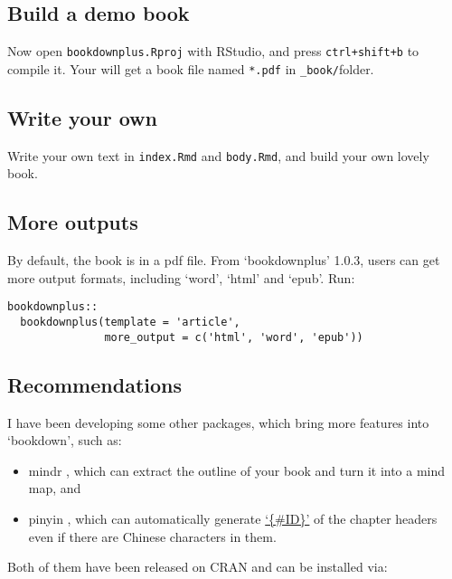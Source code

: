 \documentclass[hess, online, hvmath]{style/copernicus}
\begin{document}
\subsection{Build a demo book}\label{build-a-demo-book}

Now open \texttt{bookdownplus.Rproj} with RStudio, and press
\texttt{ctrl+shift+b} to compile it. Your will get a book file named
\texttt{*.pdf} in \texttt{\_book/}folder.

\subsection{Write your own}\label{write-your-own}

Write your own text in \texttt{index.Rmd} and \texttt{body.Rmd}, and
build your own lovely book.

\subsection{More outputs}\label{more-outputs}

By default, the book is in a pdf file. From `bookdownplus' 1.0.3, users
can get more output formats, including `word', `html' and `epub'. Run:

\begin{verbatim}
bookdownplus::
  bookdownplus(template = 'article', 
               more_output = c('html', 'word', 'epub'))
\end{verbatim}

\subsection{Recommendations}\label{recommendations}

I have been developing some other packages, which bring more features
into `bookdown', such as:

\begin{itemize}
\item
  mindr \citep{R-mindr}, which can extract the outline of your book and
  turn it into a mind map, and
\item
  pinyin \citep{R-pinyin}, which can automatically generate
  \href{https://bookdown.org/yihui/bookdown/cross-references.html}{`\{\#ID\}'}
  of the chapter headers even if there are Chinese characters in them.
\end{itemize}

Both of them have been released on CRAN and can be installed via:
\end{document}
